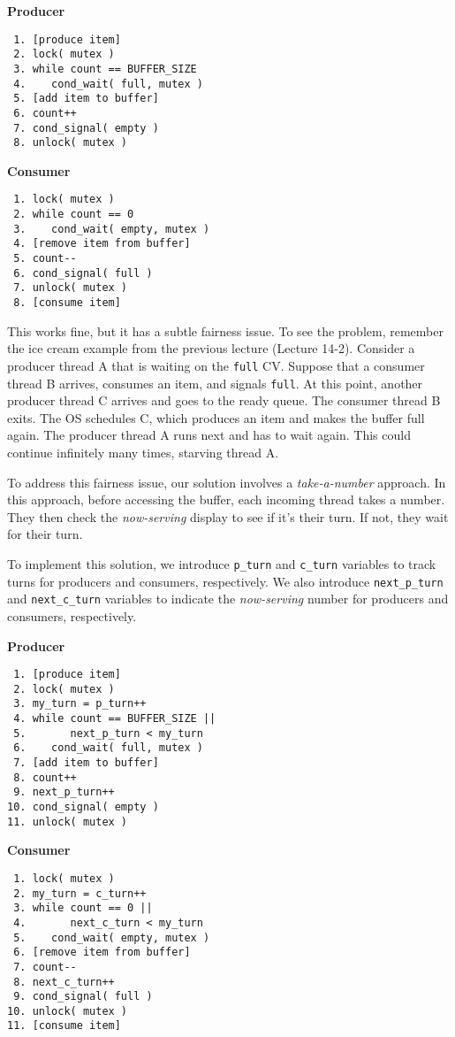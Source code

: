 \begin{multicols}{2}
    \small
    \textbf{Producer}
    \begin{verbatim}
 1. [produce item]
 2. lock( mutex )
 3. while count == BUFFER_SIZE
 4.    cond_wait( full, mutex )
 5. [add item to buffer]
 6. count++
 7. cond_signal( empty )
 8. unlock( mutex )
    \end{verbatim}
    \columnbreak
    \textbf{Consumer}\vspace{-2em}
    \begin{verbatim}
 1. lock( mutex )
 2. while count == 0
 3.    cond_wait( empty, mutex )
 4. [remove item from buffer]
 5. count--
 6. cond_signal( full )
 7. unlock( mutex )
 8. [consume item]
    \end{verbatim}
\end{multicols}
\vspace{-2em}

This works fine, but it has a subtle fairness issue.
To see the problem, remember the ice cream example from the previous lecture (Lecture 14-2).
Consider a producer thread A that is waiting on the \texttt{full} CV.
Suppose that a consumer thread B arrives, consumes an item, and signals \texttt{full}.
At this point, another producer thread C arrives and goes to the ready queue.
The consumer thread B exits.
The OS schedules C, which produces an item and makes the buffer full again.
The producer thread A runs next and has to wait again.
This could continue infinitely many times, starving thread A.

To address this fairness issue, our solution involves a \emph{take-a-number} approach.
In this approach, before accessing the buffer, each incoming thread takes a number.
They then check the \emph{now-serving} display to see if it's their turn.
If not, they wait for their turn.

To implement this solution, we introduce \texttt{p\_turn} and \texttt{c\_turn} variables to track turns for producers and consumers, respectively.
We also introduce \texttt{next\_p\_turn} and \texttt{next\_c\_turn} variables to indicate the \emph{now-serving} number for producers and consumers, respectively.

\newpage

\begin{multicols}{2}
    \small
    \textbf{Producer}
    \begin{verbatim}
 1. [produce item]
 2. lock( mutex )
 3. my_turn = p_turn++
 4. while count == BUFFER_SIZE ||
 5.       next_p_turn < my_turn
 6.    cond_wait( full, mutex )
 7. [add item to buffer]
 8. count++
 9. next_p_turn++
10. cond_signal( empty )
11. unlock( mutex )
    \end{verbatim}
    \columnbreak
    \textbf{Consumer}\vspace{-2em}
    \begin{verbatim}
 1. lock( mutex )
 2. my_turn = c_turn++
 3. while count == 0 ||
 4.       next_c_turn < my_turn
 5.    cond_wait( empty, mutex )
 6. [remove item from buffer]
 7. count--
 8. next_c_turn++
 9. cond_signal( full )
10. unlock( mutex )
11. [consume item]
    \end{verbatim}
\end{multicols}
\vspace{-2em}

